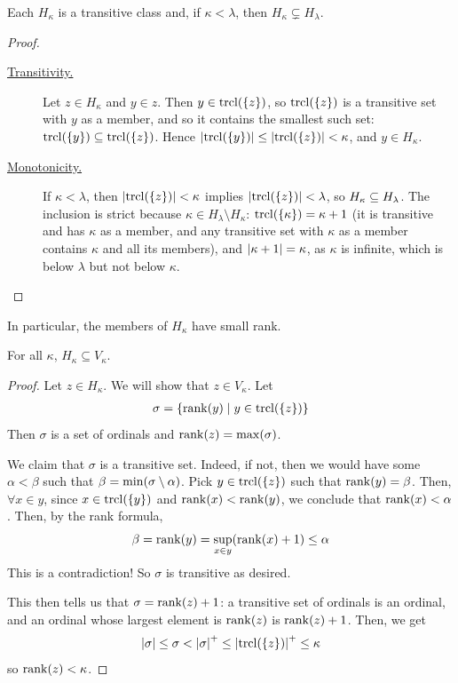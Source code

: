 \begin{boxlemma}
    Each $H_{\kappa}$ is a transitive class and, if $\kappa < \lambda$, then $H_{\kappa} \subsetneq H_{\lambda}$.
\end{boxlemma}
\begin{proof}
    \hfill
    \begin{description}
        \item[\underline{Transitivity.}] Let $z \in H_{\kappa}$ and $y \in z$. Then $y \in \operatorname{trcl}\!\left( \left\{ z \right\} \right)$, so $\operatorname{trcl}\!\left( \left\{ z \right\} \right)$ is a transitive set with $y$ as a member, and so it contains the smallest such set: $\operatorname{trcl}\!\left( \left\{ y \right\} \right) \subseteq \operatorname{trcl}\!\left( \left\{ z \right\} \right)$. Hence $\left\lvert \operatorname{trcl}\!\left( \left\{ y \right\} \right) \right\rvert \leq \left\lvert \operatorname{trcl}\!\left( \left\{ z \right\} \right) \right\rvert < \kappa$, and $y \in H_{\kappa}$.

        \item[\underline{Monotonicity.}] If $\kappa < \lambda$, then $\left\lvert \operatorname{trcl}\!\left( \left\{ z \right\} \right) \right\rvert < \kappa$ implies $\left\lvert \operatorname{trcl}\!\left( \left\{ z \right\} \right) \right\rvert < \lambda$, so $H_{\kappa} \subseteq H_{\lambda}$. The inclusion is strict because $\kappa \in H_{\lambda} \setminus H_{\kappa}$: $\operatorname{trcl}\!\left( \left\{ \kappa \right\} \right) = \kappa + 1$ (it is transitive and has $\kappa$ as a member, and any transitive set with $\kappa$ as a member contains $\kappa$ and all its members), and $\left\lvert \kappa + 1 \right\rvert = \kappa$, as $\kappa$ is infinite, which is below $\lambda$ but not below $\kappa$.
    \end{description}
\end{proof}

In particular, the members of $H_{\kappa}$ have small rank.

\begin{boxlemma}
    For all $\kappa$, $H_{\kappa} \subseteq V_{\kappa}$.
\end{boxlemma}
\begin{proof}
    Let $z \in H_{\kappa}$. We will show that $z \in V_{\kappa}$. Let
    \begin{align*}
        \sigma = \left\{ \operatorname{rank}\!\left( y \right) \; \middle\vert \; y \in \operatorname{trcl}\!\left( \left\{ z \right\} \right) \right\}
    \end{align*}
    Then $\sigma$ is a set of ordinals and $\operatorname{rank}\!\left( z \right) = \max(\sigma)$.

    We claim that $\sigma$ is a transitive set. Indeed, if not, then we would have some $\alpha < \beta$ such that $\beta = \min\!\left( \sigma \setminus \alpha \right)$. Pick $y \in \operatorname{trcl}\!\left( \left\{ z \right\} \right)$ such that $\operatorname{rank}\!\left( y \right) = \beta$. Then, $\forall x \in y$, since $x \in \operatorname{trcl}\!\left( \left\{ y \right\} \right)$ and $\operatorname{rank}\!\left( x \right) < \operatorname{rank}\!\left( y \right)$, we conclude that $\operatorname{rank}\!\left( x \right) < \alpha$. Then, by the rank formula,
    \begin{align*}
        \beta = \operatorname{rank}\!\left( y \right) = \sup_{x \in y}\!\left( \operatorname{rank}\!\left( x \right) + 1 \right) \leq \alpha
    \end{align*}
    This is a contradiction! So $\sigma$ is transitive as desired.

    This then tells us that $\sigma = \operatorname{rank}\!\left( z \right) + 1$: a transitive set of ordinals is an ordinal, and an ordinal whose largest element is $\operatorname{rank}\!\left( z \right)$ is $\operatorname{rank}\!\left( z \right) + 1$.
    Then, we get
    \begin{align*}
        \left\lvert \sigma \right\rvert \leq \sigma < \left\lvert \sigma \right\rvert^+ \leq \left\lvert \operatorname{trcl}\!\left( \left\{ z \right\} \right) \right\rvert^+ \leq \kappa
    \end{align*}
    so $\operatorname{rank}\!\left( z \right) < \kappa$.
\end{proof}

